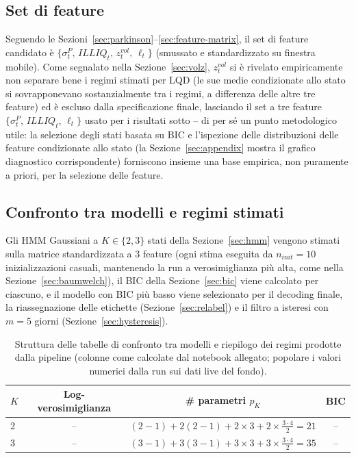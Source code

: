 \documentclass[11pt]{article}
\theoremstyle{definition}
\theoremstyle{remark}
\begin{document}
\subsection{Set di feature}

Seguendo le Sezioni~\ref{sec:parkinson}--\ref{sec:feature-matrix}, il set di feature candidato \`e $\{\sigma^P_t,\,ILLIQ_t,\,z^{vol}_t,\,\ell_t\}$ (smussato e standardizzato su finestra mobile). Come segnalato nella Sezione~\ref{sec:volz}, $z^{vol}_t$ si \`e rivelato empiricamente non separare bene i regimi stimati per LQD (le sue medie condizionate allo stato si sovrapponevano sostanzialmente tra i regimi, a differenza delle altre tre feature) ed \`e escluso dalla specificazione finale, lasciando il set a tre feature $\{\sigma^P_t,\,ILLIQ_t,\,\ell_t\}$ usato per i risultati sotto -- di per s\'e un punto metodologico utile: la selezione degli stati basata su BIC e l'ispezione delle distribuzioni delle feature condizionate allo stato (la Sezione~\ref{sec:appendix} mostra il grafico diagnostico corrispondente) forniscono insieme una base empirica, non puramente a priori, per la selezione delle feature.

\subsection{Confronto tra modelli e regimi stimati}

Gli HMM Gaussiani a $K\in\{2,3\}$ stati della Sezione~\ref{sec:hmm} vengono stimati sulla matrice standardizzata a 3 feature (ogni stima eseguita da $n_{init}=10$ inizializzazioni casuali, mantenendo la run a verosimiglianza pi\`u alta, come nella Sezione~\ref{sec:baumwelch}), il BIC della Sezione~\ref{sec:bic} viene calcolato per ciascuno, e il modello con BIC pi\`u basso viene selezionato per il decoding finale, la riassegnazione delle etichette (Sezione~\ref{sec:relabel}) e il filtro a isteresi con $m=5$ giorni (Sezione~\ref{sec:hysteresis}).

\begin{table}[H]
\centering
\caption{Struttura delle tabelle di confronto tra modelli e riepilogo dei regimi prodotte dalla pipeline (colonne come calcolate dal notebook allegato; popolare i valori numerici dalla run sui dati live del fondo).}
\label{tab:results-template}
\begin{tabular}{lccc}
\toprule
$K$ & Log-verosimiglianza & \# parametri $p_K$ & BIC \\
\midrule
2 & -- & $(2{-}1)+2(2{-}1)+2{\times}3+2{\times}\frac{3\cdot4}{2}=21$ & -- \\
3 & -- & $(3{-}1)+3(3{-}1)+3{\times}3+3{\times}\frac{3\cdot4}{2}=35$ & -- \\
\bottomrule
\end{tabular}
\end{table}
\end{document}
